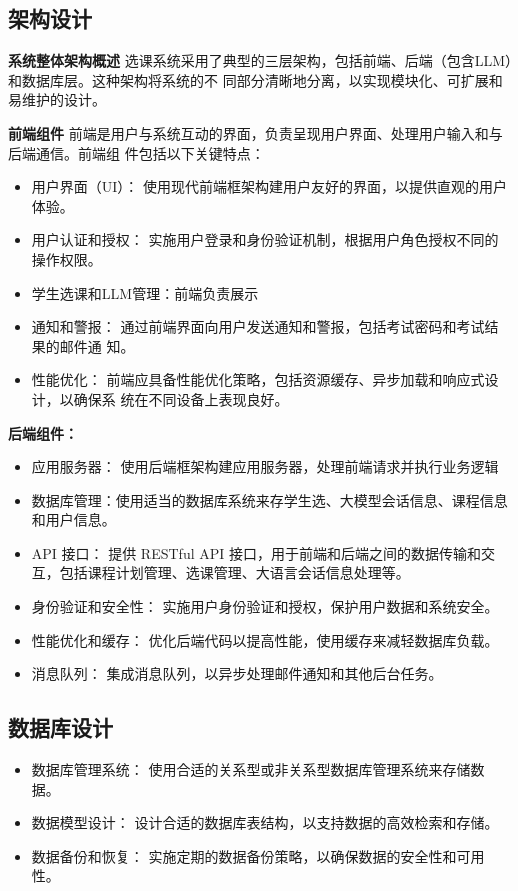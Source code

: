 \documentclass{article}
\begin{document}
\subsection{架构设计}
\textbf{系统整体架构概述}
选课系统采用了典型的三层架构，包括前端、后端（包含LLM）和数据库层。这种架构将系统的不
同部分清晰地分离，以实现模块化、可扩展和易维护的设计。


\textbf{前端组件}
前端是用户与系统互动的界面，负责呈现用户界面、处理用户输入和与后端通信。前端组
件包括以下关键特点：
\begin{itemize}
  \item 用户界面（UI）： 使用现代前端框架构建用户友好的界面，以提供直观的用户体验。
  \item 用户认证和授权： 实施用户登录和身份验证机制，根据用户角色授权不同的操作权限。
  \item 学生选课和LLM管理：前端负责展示
  \item 通知和警报： 通过前端界面向用户发送通知和警报，包括考试密码和考试结果的邮件通
  知。
  \item 性能优化： 前端应具备性能优化策略，包括资源缓存、异步加载和响应式设计，以确保系
  统在不同设备上表现良好。
\end{itemize}

\textbf{后端组件：}
\begin{itemize}
  \item 应用服务器： 使用后端框架构建应用服务器，处理前端请求并执行业务逻辑
  \item 数据库管理：使用适当的数据库系统来存学生选、大模型会话信息、课程信息和用户信息。
  \item API 接口： 提供 RESTful API 接口，用于前端和后端之间的数据传输和交互，包括课程计划管理、选课管理、大语言会话信息处理等。
  \item 身份验证和安全性： 实施用户身份验证和授权，保护用户数据和系统安全。
  \item 性能优化和缓存： 优化后端代码以提高性能，使用缓存来减轻数据库负载。
  \item 消息队列： 集成消息队列，以异步处理邮件通知和其他后台任务。
\end{itemize}

\subsection{数据库设计}
\begin{itemize}
    \item 数据库管理系统： 使用合适的关系型或非关系型数据库管理系统来存储数据。
    \item 数据模型设计： 设计合适的数据库表结构，以支持数据的高效检索和存储。
    \item 数据备份和恢复： 实施定期的数据备份策略，以确保数据的安全性和可用性。
  \end{itemize}
\end{document}
